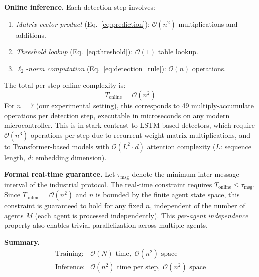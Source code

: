 \documentclass[manuscript,screen,review]{acmart}
\begin{document}
\textbf{Online inference.}
Each detection step involves:
\begin{enumerate}
  \item \textit{Matrix-vector product} (Eq.~\eqref{eq:prediction}):
  $\mathcal{O}(n^2)$ multiplications and additions.
  \item \textit{Threshold lookup}
  (Eq.~\eqref{eq:threshold}): $\mathcal{O}(1)$ table lookup.
  \item \textit{$\ell_2$-norm computation}
  (Eq.~\eqref{eq:detection_rule}): $\mathcal{O}(n)$
  operations.
\end{enumerate}
The total per-step online complexity is:
\begin{equation}
  T_{\text{online}} = \mathcal{O}(n^2)
  \label{eq:online_complexity}
\end{equation}
For $n = 7$ (our experimental setting), this corresponds
to 49 multiply-accumulate operations per detection step,
executable in microseconds on any modern microcontroller.
This is in stark contrast to LSTM-based detectors, which
require $\mathcal{O}(n^3)$ operations per step due to
recurrent weight matrix multiplications, and to
Transformer-based models with $\mathcal{O}(L^2 \cdot d)$
attention complexity ($L$: sequence length, $d$: embedding
dimension).

\textbf{Formal real-time guarantee.}
Let $\tau_{\text{msg}}$ denote the minimum inter-message
interval of the industrial protocol. The real-time constraint
requires $T_{\text{online}} \leq \tau_{\text{msg}}$.
Since $T_{\text{online}} = \mathcal{O}(n^2)$ and $n$ is
bounded by the finite agent state space, this constraint
is guaranteed to hold for any fixed $n$, independent of
the number of agents $M$ (each agent is processed
independently). This \textit{per-agent independence}
property also enables trivial parallelization across
multiple agents.

\textbf{Summary.}
\begin{equation}
  \begin{array}{ll}
    \text{Training:} & \mathcal{O}(N) \text{ time},\;
    \mathcal{O}(n^2) \text{ space} \\
    \text{Inference:} & \mathcal{O}(n^2) \text{ time per step},\;
    \mathcal{O}(n^2) \text{ space}
  \end{array}
  \label{eq:complexity_summary}
\end{equation}

\end{document}
